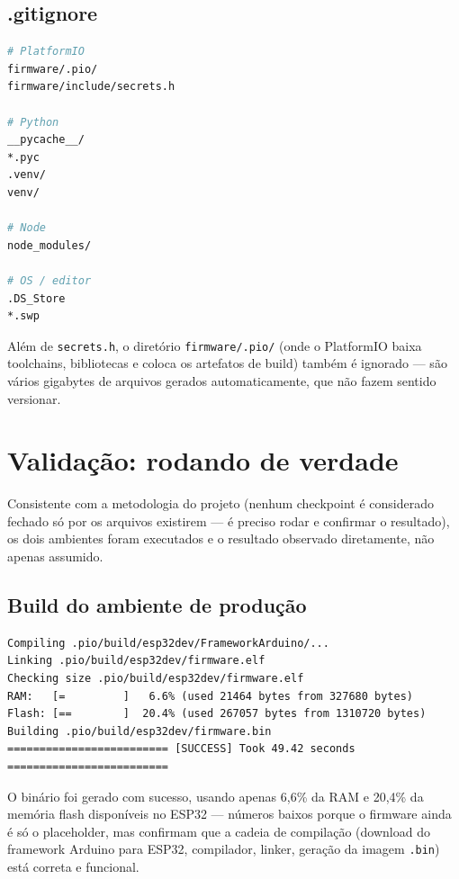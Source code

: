 \documentclass[11pt,a4paper]{article}
\begin{document}
\subsection{.gitignore}

\begin{lstlisting}[language=bash,caption={.gitignore (raiz do projeto)}]
# PlatformIO
firmware/.pio/
firmware/include/secrets.h

# Python
__pycache__/
*.pyc
.venv/
venv/

# Node
node_modules/

# OS / editor
.DS_Store
*.swp
\end{lstlisting}

Além de \texttt{secrets.h}, o diretório \texttt{firmware/.pio/} (onde o PlatformIO baixa toolchains, bibliotecas e coloca os artefatos de build) também é ignorado --- são vários gigabytes de arquivos gerados automaticamente, que não fazem sentido versionar.

\section{Validação: rodando de verdade}

Consistente com a metodologia do projeto (nenhum checkpoint é considerado fechado só por os arquivos existirem --- é preciso rodar e confirmar o resultado), os dois ambientes foram executados e o resultado observado diretamente, não apenas assumido.

\subsection{Build do ambiente de produção}

\begin{lstlisting}[caption={Saída de \texttt{pio run -e esp32dev} (resumida)}]
Compiling .pio/build/esp32dev/FrameworkArduino/...
Linking .pio/build/esp32dev/firmware.elf
Checking size .pio/build/esp32dev/firmware.elf
RAM:   [=         ]   6.6% (used 21464 bytes from 327680 bytes)
Flash: [==        ]  20.4% (used 267057 bytes from 1310720 bytes)
Building .pio/build/esp32dev/firmware.bin
========================= [SUCCESS] Took 49.42 seconds =========================
\end{lstlisting}

O binário foi gerado com sucesso, usando apenas 6,6\% da RAM e 20,4\% da memória flash disponíveis no ESP32 --- números baixos porque o firmware ainda é só o placeholder, mas confirmam que a cadeia de compilação (download do framework Arduino para ESP32, compilador, linker, geração da imagem \texttt{.bin}) está correta e funcional.
\end{document}
